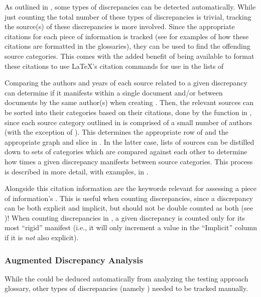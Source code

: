 As outlined in , some types of discrepancies can be detected
automatically. While just counting the total number of these types of
discrepancies is trivial, tracking the source(s) of these discrepancies is more
involved. Since the appropriate citations for each piece of information is
tracked (see  for examples of
how these citations are formatted in the glossaries), they can be used to find
the offending source categories. This comes with the added benefit of being
available to format these citations to use \LaTeX{}'s citation commands for use
in the lists of \autoDiscreps[.]{}

Comparing the authors and years of each source related to a given discrepancy
can determine if it manifests within a single document and/or between documents
by the same author(s) when creating . Then, the
relevant sources can be sorted into their categories based on their citations,
done by the function in , since each source category
outlined in  is comprised of a small number of authors (with the
exception of ).
This determines the appropriate row of  and the appropriate
graph and slice in . In the latter case, lists of
sources can be distilled down to sets of categories which are compared against
each other to determine how times a given discrepancy manifests between source
categories. This process is described in more detail, with examples, in
.

Alongside this citation information are the keywords relevant for assessing a
piece of information's . This is useful when counting
discrepancies, since a discrepancy can be both explicit and implicit, but
should not be double counted as both (see )! When counting
discrepancies in , a given discrepancy is counted only for
its most ``rigid'' manifest (i.e., it will only increment a value in the
``Implicit'' column if it is \emph{not} also explicit).


\subsubsection{Augmented Discrepancy Analysis}
\label{aug-discrep-analysis}
While the \autoDiscreps{} could be deduced automatically from analyzing the
testing approach glossary, other types of discrepancies (namely
) needed to be tracked manually.
